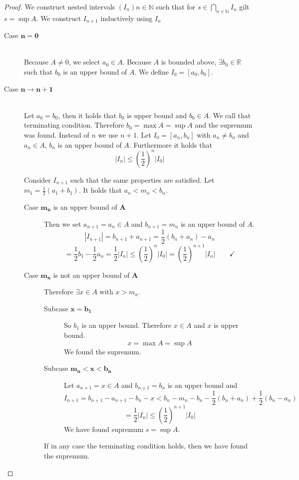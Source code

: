 \documentclass[a4paper,landscape,twocolumn]{article}
\theoremstyle{definition}
\newcommand\abs[1]{\left|#1\right|}
\begin{document}
\begin{proof}
  We construct nested intervals $(I_n){{n \in \mathbb N}}$ such that
  for $s \in \bigcap_{n \in \mathbb N} I_n$ gilt $s = \sup{A}$.
  We construct $I_{n+1}$ inductively using $I_n$

  \begin{description}
    \item[Case $\mathbf{n = 0}$] \hfill{} \\
      Because $A \neq 0$, we select $a_0 \in A$.
      Because $A$ is bounded above, $\exists b_0 \in \mathbb R$
      such that $b_0$ is an upper bound of $A$.
      We define $I_0 = [a_0, b_0]$.
    \item[Case $\mathbf{n \rightarrow n + 1}$] \hfill{} \\
      Let $a_0 = b_0$, then it holds that $b_0$ is upper bound and $b_0 \in A$.
      We call that terminating condition.
      Therefore $b_0 = \max{A} = \sup{A}$ and the supremum was found.
      Instead of $n$ we use $n + 1$.
      Let $I_0 = [a_n, b_n]$ with $a_n \neq b_n$ and $a_n \in A$,
      $b_n$ is an upper bound of $A$. Furthermore it holds that
      \[ \abs{I_n} \leq \left(\frac12\right)^n \abs{I_0} \]

      Consider $I_{n+1}$ such that the same properties are satisfied.
      Let $m_1 = \frac12 (a_1 + b_1)$. It holds that $a_n < m_n < b_n$.

      \begin{description}
        \item[Case $\mathbf{m_n}$ is an upper bound of $\mathbf{A}$]
          Then we set $a_{n+1} = a_n \in A$ and
          $b_{n+1} = m_n$ is an upper bound of $A$.
          \[ \abs{I_{n+1}} = b_{n+1} + a_{n+1} = \frac12 (b_n + a_n) - a_n \]
          \[
            = \frac12 b_1 - \frac12 a_n = \frac12 \abs{I_n}
            \leq \left(\frac12\right)^n \abs{I_0}
            = \left(\frac12\right)^{n+1} \abs{I_n}
            \qquad \checkmark
          \]
        \item[Case $\mathbf{m_n}$ is not an upper bound of $\mathbf{A}$]
          Therefore $\exists x \in A$ with $x > m_n$.
          \begin{description}
            \item[Subcase $\mathbf{x = b_1}$]
              So $b_1$ is an upper bound.
              Therefore $x \in A$ and $x$ is upper bound.
              \[ x = \max{A} = \sup{A} \]
              We found the supremum.
            \item[Subcase $\mathbf{m_n < x < b_n}$]
              Let $a_{n+1} = x \in A$ and $b_{n + 1} = b_n$ is an upper bound
              and
              \[
                  I_{n + 1} = b_{n+1} - a_{n+1} - b_n - x
                  < b_n - m_n - b_n - \frac12 (b_n + a_n) + \frac12 (b_n - a_n)
              \] \[
                  = \frac12 \abs{I_n} \leq \left(\frac12\right)^{n+1} \abs{I_0}
              \]
              We have found supremum $s = \sup{A}$.
          \end{description}
          If in any case the terminating condition holds, then we have found
          the supremum.


\end{description}
\end{description}
\end{proof}
\end{document}
